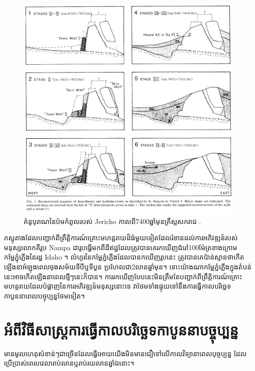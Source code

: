 \documentclass[10pt,twocolumn,letterpaper]{article}
\begin{document}
\begin{figure}[t]
\begin{center}

   \includegraphics[width=1\linewidth]{jericho.jpg}
\end{center}
   \caption{គំនូបុរាណនៃប៉មកំពូលរបស់ Jericho កាលពី7400ឆ្នាំមុនគ្រឹស្តសករាជ \cite{95}.}
\label{fig:14}
\label{fig:onecol}
\end{figure}

ភស្តុតាងដែលបញ្ជាក់ពីព្រឹត្តិការណ៍គ្រោះមហន្តរាយដ៏ធំមួយទៀតដែលរំខានដល់ការអភិវឌ្ឍន៍របស់មនុស្សលោកគឺរូប Nampa ជារូបធ្វើមកពីដីឥដ្ឋដែលត្រូវបានគេរកឃើញជំរៅ100ម៉ែត្រខាងក្រោមកម្អែភ្នុំភ្លើងនៃរដ្ឋ Idaho \cite{102,103}។ លំហូរនៃកម្អែភ្នំភ្លើងដែលបានកឃើញរូបនេះ ត្រូវបានគេប៉ាន់ស្មានថាកើតឡើងនាអំឡុងពេលចុងសម័យទីបីឬទីបួន ប្រហែលជា2លានឆ្នាំមុន។ ទោះយ៉ាងណាកម្អែភ្នំភ្លើងក្នុងតំបន់នេះអាចកើតឡើងនាពេលថ្មីៗនេះក៏បាន។ ការរកឃើញបែបនេះមិនត្រឹមតែបញ្ជាក់ពីព្រឹត្តិការណ៍គ្រោះមហន្ថរាយដែលបំផ្លាញនៃការអភិវឌ្ឍន៍មនុស្សនោះទេ វាថែមទាំងផ្ទុយទៅនឹងការធ្វើកាលបរិច្ឆេទកាបូននាពេលបច្ចុប្បន្នថែមទៀត។

\section{អំពីវិធីសាស្ត្រការធ្វើកាលបរិច្ឆេទកាបូននាបច្ចុប្បន្ន}

មានមូលហេតុសំខាន់ៗជាច្រើនដែលធ្វើអោយយើងមិនមានជឿទៅលើកាលវិទ្យានាពេលបុច្ចប្បន្ន ដែលប្រើប្រាស់ពេលវេលារាប់លានឬរាប់រយលានឆ្នាំឯនោះ។
\end{document}
